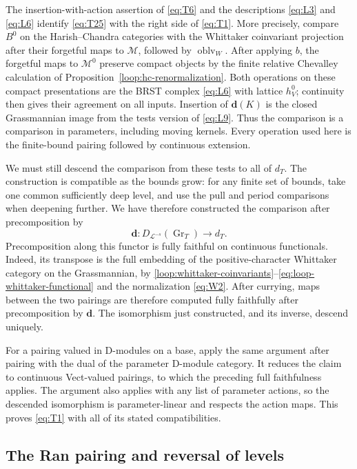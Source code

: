 The insertion-with-action assertion of \eqref{eq:T6} and the descriptions
\eqref{eq:L3} and \eqref{eq:L6} identify \eqref{eq:T25} with the right
side of \eqref{eq:T1}.  More precisely, compare $B^0$ on the
Harish--Chandra categories with the Whittaker coinvariant projection
after their forgetful maps to $\mathcal M$, followed by
$\operatorname{oblv}_W$.  After applying
$b$, the forgetful maps to $\mathcal M^0$ preserve compact objects by
the finite relative Chevalley calculation of
Proposition~\ref{loop:hc-renormalization}.  Both operations on these
compact presentations are the BRST complex \eqref{eq:L6} with lattice
$h_V^0$; continuity then gives their agreement on all inputs.  Insertion
of $\mathbf d(K)$ is the closed Grassmannian image from the tests version
of \eqref{eq:L9}.  Thus the comparison is a comparison in parameters,
including moving kernels.  Every operation used here is the finite-bound
pairing followed by continuous extension.

We must still descend the comparison from these tests to all of $d_T$.
The construction is compatible as the bounds grow: for any finite set of
bounds, take one common sufficiently deep level, and use the pull and
period comparisons when deepening further.  We have therefore constructed
the comparison after precomposition by
\[
 \mathbf d:D_{\mathcal L^{-s}}(\operatorname{Gr}_T)\longrightarrow d_T.
\]
Precomposition along this functor is fully faithful on continuous
functionals.  Indeed, its transpose is the full embedding of the
positive-character Whittaker category on the Grassmannian, by
\eqref{loop:whittaker-coinvariants}--\eqref{eq:loop-whittaker-functional}
and the normalization
\eqref{eq:W2}.  After currying, maps between the two pairings are therefore
computed fully faithfully after precomposition by $\mathbf d$.
The isomorphism just constructed, and its inverse, descend uniquely.

For a pairing valued in D-modules on a base, apply the same argument after
pairing with the dual of the parameter D-module category.  It reduces the
claim to continuous Vect-valued pairings, to which the preceding full
faithfulness applies.  The argument also applies with any list of
parameter actions, so the descended isomorphism is parameter-linear and
respects the action maps.  This proves \eqref{eq:T1} with all of its
stated compatibilities.

\subsection{The Ran pairing and reversal of levels}

